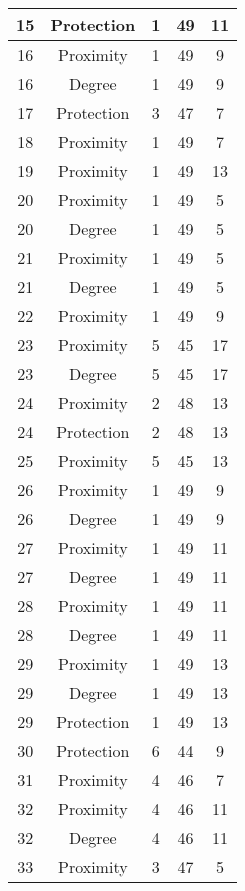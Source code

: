\documentclass[results.tex]{subfiles}
\begin{document}
\begin{center}
\begin{tabular}{| c || c | c | c | c |}
    15 & Protection & 1 & 49 & 11 \\ 
    \hline
    16 & Proximity & 1 & 49 & 9 \\ 
    \hline
    16 & Degree & 1 & 49 & 9 \\ 
    \hline
    17 & Protection & 3 & 47 & 7 \\ 
    \hline
    18 & Proximity & 1 & 49 & 7 \\ 
    \hline
    19 & Proximity & 1 & 49 & 13 \\ 
    \hline
    20 & Proximity & 1 & 49 & 5 \\ 
    \hline
    20 & Degree & 1 & 49 & 5 \\ 
    \hline
    21 & Proximity & 1 & 49 & 5 \\ 
    \hline
    21 & Degree & 1 & 49 & 5 \\ 
    \hline
    22 & Proximity & 1 & 49 & 9 \\ 
    \hline
    23 & Proximity & 5 & 45 & 17 \\ 
    \hline
    23 & Degree & 5 & 45 & 17 \\ 
    \hline
    24 & Proximity & 2 & 48 & 13 \\ 
    \hline
    24 & Protection & 2 & 48 & 13 \\ 
    \hline
    25 & Proximity & 5 & 45 & 13 \\ 
    \hline
    26 & Proximity & 1 & 49 & 9 \\ 
    \hline
    26 & Degree & 1 & 49 & 9 \\ 
    \hline
    27 & Proximity & 1 & 49 & 11 \\ 
    \hline
    27 & Degree & 1 & 49 & 11 \\ 
    \hline
    28 & Proximity & 1 & 49 & 11 \\ 
    \hline
    28 & Degree & 1 & 49 & 11 \\ 
    \hline
    29 & Proximity & 1 & 49 & 13 \\ 
    \hline
    29 & Degree & 1 & 49 & 13 \\ 
    \hline
    29 & Protection & 1 & 49 & 13 \\ 
    \hline
    30 & Protection & 6 & 44 & 9 \\ 
    \hline
    31 & Proximity & 4 & 46 & 7 \\ 
    \hline
    32 & Proximity & 4 & 46 & 11 \\ 
    \hline
    32 & Degree & 4 & 46 & 11 \\ 
    \hline
    33 & Proximity & 3 & 47 & 5 \\ 
    \hline

\end{tabular}
\end{center}
\end{document}
